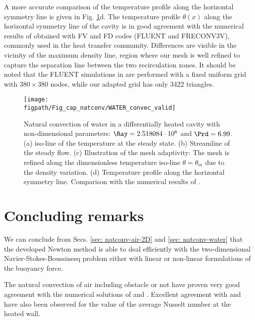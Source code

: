 A more accurate comparison of the temperature profile along the horizontal symmetry line is given in Fig. \ref{fig-T1w-isoT}d. 
The temperature profile $\theta(x)$ along the horizontal symmetry line of the cavity is in good agreement with the numerical results   of \cite{Kowalewski-2003} obtained with FV and FD codes (FLUENT and FRECONV3V), commonly used in the heat transfer community. Differences are visible in the vicinity of the maximum density line, region where our mesh is well refined to capture the separation line between the two recirculation zones. It should be noted that the FLUENT simulations in \cite{Kowalewski-2003} are performed with a fixed uniform grid with $380\times380$ nodes, while our adapted grid has only 3422 triangles.

\begin{figure}
	\begin{center}
		\texttt{[image: \\figpath/Fig\_cap\_natconv/WATER\_convec\_valid]}
	\end{center}
	\caption{Natural convection of water in a differentially heated cavity with non-dimensional parameters: $\Ray=2.518084\cdot 10^{6}$ and $\Prd=6.99$. (a) iso-line of the temperature at the steady state. (b) Streamline of the steady flow. (c) Illustration of the mesh adaptivity: The mesh is refined along the dimensionless temperature iso-line $\theta = \theta_m$ due to the density variation. (d) Temperature profile along the horizontal symmetry line. Comparison with the numerical results of \cite{Kowalewski-2003}.}
	\label{fig-T1w-isoT} %
\end{figure}

\newpage
\section{Concluding remarks}

We can conclude from Secs. \ref{sec: natconv-air-2D} and \ref{sec: natconv-water} that the developed Newton method is able to deal  efficiently with the two-dimensional Navier-Stokes-Boussinesq problem either with linear or non-linear formulations of the buoyancy force.

\noindent The natural convection of air including obstacle or not have proven very good agreement with the numerical solutions of \cite{LeQuere91} and \cite{Raluca2013}.
Excellent agreement with \cite{de1983natural} and \cite{LeQuere91} have also been observed for the value of the average Nusselt number at the heated wall. 

